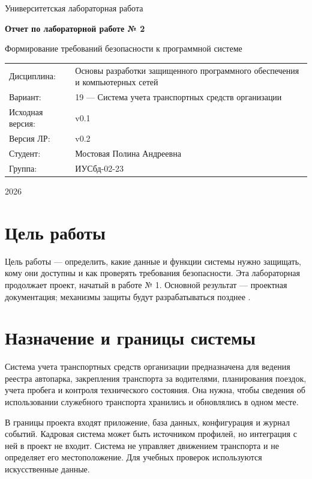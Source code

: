 \documentclass[12pt,a4paper]{article}
\begin{document}
\begin{titlepage}
\centering
{\large Университетская лабораторная работа\par}
\vspace{2.5cm}
{\LARGE\bfseries Отчет по лабораторной работе № 2\par}
\vspace{0.6cm}
{\Large Формирование требований безопасности к программной системе\par}
\vspace{1.8cm}
\begin{tabular}{p{4cm}p{11cm}}
Дисциплина: & Основы разработки защищенного программного обеспечения и компьютерных сетей\\
Вариант: & 19 — Система учета транспортных средств организации\\
Исходная версия: & v0.1\\
Версия ЛР: & v0.2\\
Студент: & Мостовая Полина Андреевна\\
Группа: & ИУСбд-02-23
\end{tabular}
\vfill
{\large 2026\par}
\end{titlepage}
\tableofcontents
\clearpage

\section{Цель работы}
Цель работы — определить, какие данные и функции системы нужно защищать, кому они доступны и как проверять требования безопасности. Эта лабораторная продолжает проект, начатый в работе № 1. Основной результат — проектная документация; механизмы защиты будут разрабатываться позднее \cite{method2}.

\section{Назначение и границы системы}
Система учета транспортных средств организации предназначена для ведения реестра автопарка, закрепления транспорта за водителями, планирования поездок, учета пробега и контроля технического состояния. Она нужна, чтобы сведения об использовании служебного транспорта хранились и обновлялись в одном месте.

В границы проекта входят приложение, база данных, конфигурация и журнал событий. Кадровая система может быть источником профилей, но интеграция с ней в проект не входит. Система не управляет движением транспорта и не определяет его местоположение. Для учебных проверок используются искусственные данные.
\end{document}
